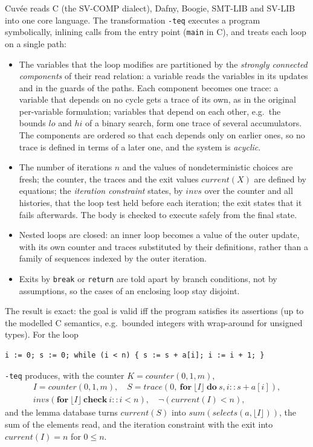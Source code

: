 \documentclass[a4paper,11pt]{article}
\newcommand{\cuvee}{Cuvée}
\newcommand{\tr}[1]{\lfloor #1\rfloor}
\begin{document}
\cuvee{} reads C (the SV-COMP dialect), Dafny, Boogie, SMT-LIB and SV-LIB into one core language. The transformation
\texttt{-teq} executes a program symbolically, inlining calls from the entry point (\texttt{main} in C), and treats
each loop on a single path:
\begin{itemize}
\item The variables that the loop modifies are partitioned by the \emph{strongly connected components} of their
  read relation: a variable reads the variables in its updates and in the guards of the paths. Each component
  becomes one trace: a variable that depends on no cycle gets a trace of its own, as in the original per-variable
  formulation; variables that depend on each other, e.g.\ the bounds $\mathit{lo}$ and $\mathit{hi}$ of a binary
  search, form one trace of several accumulators. The components are ordered so that each depends only on earlier
  ones, so no trace is defined in terms of a later one, and the system is \emph{acyclic}.
\item The number of iterations $n$ and the values of nondeterministic choices are fresh; the counter, the traces and
  the exit values $\mathit{current}(X)$ are defined by equations; the \emph{iteration constraint} states, by
  $\mathit{invs}$ over the counter and all histories, that the loop test held before each iteration; the exit
  states that it fails afterwards. The body is checked to execute safely from the final state.
\item Nested loops are closed: an inner loop becomes a value of the outer update, with its own counter and traces
  substituted by their definitions, rather than a family of sequences indexed by the outer iteration.
\item Exits by \texttt{break} or \texttt{return} are told apart by branch conditions, not by assumptions, so the
  cases of an enclosing loop stay disjoint.
\end{itemize}
The result is exact: the goal is valid iff the program satisfies its assertions (up to the modelled C semantics,
e.g.\ bounded integers with wrap-around for unsigned types). For the loop
\begin{lstlisting}
i := 0; s := 0; while (i < n) { s := s + a[i]; i := i + 1; }
\end{lstlisting}
\texttt{-teq} produces, with the counter $K = \mathit{counter}(0, 1, m)$,
\begin{gather*}
I = \mathit{counter}(0, 1, m),\quad S = \mathit{trace}(0,\ \textbf{for}\ \tr{I}\ \textbf{do}\ s, i :: s + a[i]),\\
\mathit{invs}(\textbf{for}\ \tr{I}\ \textbf{check}\ i :: i < n),\quad \neg(\mathit{current}(I) < n),
\end{gather*}
and the lemma database turns $\mathit{current}(S)$ into $\mathit{sum}(\mathit{selects}(a, \tr{I}))$, the sum of
the elements read, and the iteration constraint with the exit into $\mathit{current}(I) = n$ for $0 \le n$.
\end{document}
